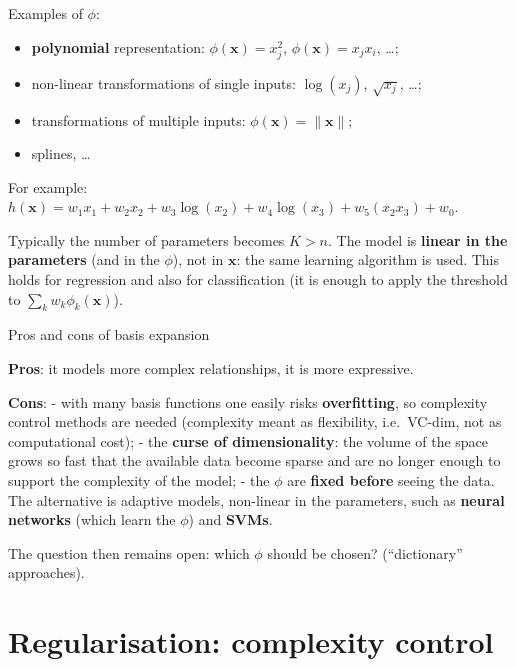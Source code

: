Examples of \(\phi\):

\begin{itemize}
\tightlist
\item
  \textbf{polynomial} representation: \(\phi(\mathbf{x}) = x_j^2\),
  \(\phi(\mathbf{x}) = x_j x_i\), \ldots;
\item
  non-linear transformations of single inputs: \(\log(x_j)\),
  \(\sqrt{x_j}\), \ldots;
\item
  transformations of multiple inputs:
  \(\phi(\mathbf{x}) = \|\mathbf{x}\|\);
\item
  splines, \ldots{}
\end{itemize}

For example:
\(h(\mathbf{x}) = w_1x_1 + w_2x_2 + w_3\log(x_2) + w_4\log(x_3) + w_5(x_2x_3) + w_0\).

Typically the number of parameters becomes \(K > n\). The model is
\textbf{linear in the parameters} (and in the \(\phi\)), not in
\(\mathbf{x}\): the same learning algorithm is used. This holds for
regression and also for classification (it is enough to apply the
threshold to \(\sum_k w_k\phi_k(\mathbf{x})\)).

\begin{boxwarning}{Pros and cons of basis expansion}

\textbf{Pros}: it models more complex relationships, it is more
expressive.

\textbf{Cons}: - with many basis functions one easily risks
\textbf{overfitting}, so complexity control methods are needed
(complexity meant as flexibility, i.e.\ VC-dim, not as computational
cost); - the \textbf{curse of dimensionality}: the volume of the space
grows so fast that the available data become sparse and are no longer
enough to support the complexity of the model; - the \(\phi\) are
\textbf{fixed before} seeing the data. The alternative is adaptive
models, non-linear in the parameters, such as \textbf{neural networks}
(which learn the \(\phi\)) and \textbf{SVMs}.

The question then remains open: which \(\phi\) should be chosen?
(``dictionary'' approaches).

\end{boxwarning}

\section{Regularisation: complexity
control}\label{regolarizzazione-il-controllo-della-complessituxe0}

